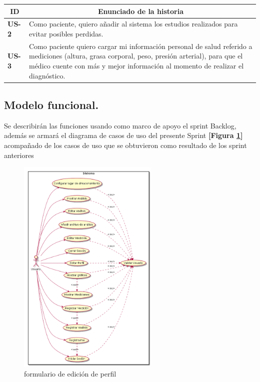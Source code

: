 \documentclass[a4paper,12pt]{article}
\begin{document}
\begin{table}[h]

    \centering
	\begin{tabular}{|l|p{9cm}|}
	\hline
        \multicolumn{1}{|c|}{\textbf{ID}} &
        \multicolumn{1}{c|}{\textbf{Enunciado de la historia}} \\          
    \hline
        \textbf{US-2 } & Como paciente, quiero añadir al sistema los estudios realizados para evitar posibles perdidas.\\
    \hline
    	\textbf{US-3} & Como paciente quiero cargar mi información personal de salud referido a mediciones (altura, grasa corporal, peso, presión arterial), para que el médico cuente con más y mejor información al momento de realizar el diagnóstico.\\
    \hline
    \end{tabular}
    \label{sprint_backlog_6}
\end{table}

\subsection{ Modelo funcional.} %
Se describirán las funciones usando como marco de apoyo el sprint Backlog, además se armará el diagrama de casos de uso del presente Sprint \textbf{[Figura \ref{6-cu}]} acompañado de los casos de uso que se obtuvieron como resultado de los sprint anteriores



\begin{figure}[h]
	\centering
	\includegraphics[width=0.6\textwidth]{img/6-cu}
	\caption{formulario de edición de perfil}
	\label{6-cu}
\end{figure}
\end{document}
